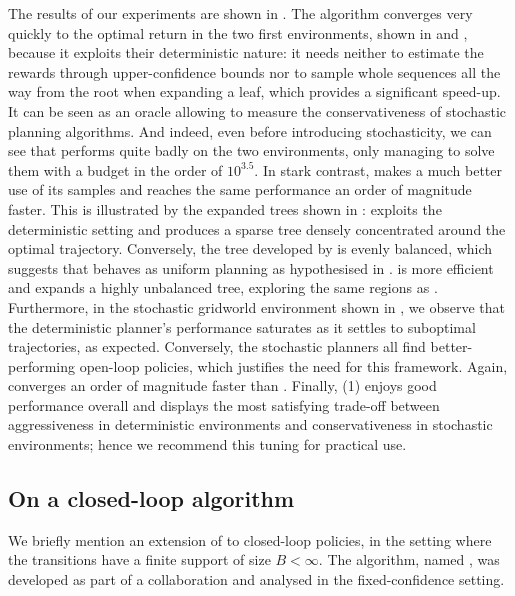 The results of our experiments are shown in . The \OPD algorithm converges very quickly to the optimal return in the two first environments, shown in  and , because it exploits their deterministic nature: it needs neither to estimate the rewards through upper-confidence bounds nor to sample whole sequences all the way from the root when expanding a leaf, which provides a significant speed-up. It can be seen as an oracle allowing to measure the conservativeness of stochastic planning algorithms. And indeed, even before introducing stochasticity, we can see that \OLOP performs quite badly on the two environments, only managing to solve them with a budget in the order of $10^{3.5}$. In stark contrast, \KLOLOP makes a much better use of its samples and reaches the same performance an order of magnitude faster. This is illustrated by the expanded trees shown in : \OPD exploits the deterministic setting and produces a sparse tree densely concentrated around the optimal trajectory. Conversely, the tree developed by \OLOP is evenly balanced, which suggests that \OLOP behaves as uniform planning as hypothesised in . \KLOLOP is more efficient and expands a highly unbalanced tree, exploring the same regions as \OPD. Furthermore, in the stochastic gridworld environment shown in , we observe that the deterministic \OPD planner's performance saturates as it settles to suboptimal trajectories, as expected. Conversely, the stochastic planners all find better-performing open-loop policies, which justifies the need for this framework. Again, \KLOLOP converges an order of magnitude faster than \OLOP. Finally, \KLOLOP(1) enjoys good performance overall and displays the most satisfying trade-off between aggressiveness in deterministic environments and conservativeness in stochastic environments; hence we recommend this tuning for practical use.

\subsection{On a closed-loop algorithm}

We briefly mention an extension of \KLOLOP to closed-loop policies, in the setting where the transitions have a finite support of size $B < \infty$. The algorithm, named \MDPGapE, was developed as part of a collaboration \citep{Jonsson2020planning} and analysed in the fixed-confidence setting.

